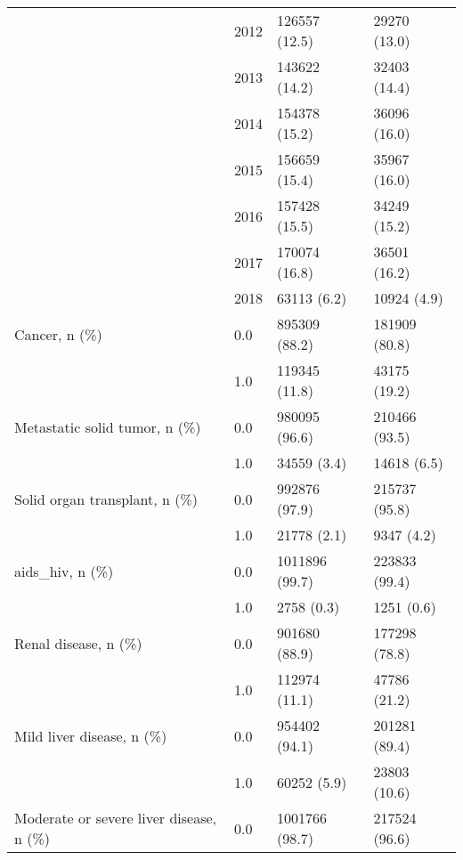 \begin{tabular}{llll}
                                       & 2012 &            126557 (12.5) &      29270 (13.0) \\
                                       & 2013 &            143622 (14.2) &      32403 (14.4) \\
                                       & 2014 &            154378 (15.2) &      36096 (16.0) \\
                                       & 2015 &            156659 (15.4) &      35967 (16.0) \\
                                       & 2016 &            157428 (15.5) &      34249 (15.2) \\
                                       & 2017 &            170074 (16.8) &      36501 (16.2) \\
                                       & 2018 &              63113 (6.2) &       10924 (4.9) \\
Cancer, n (\%) & 0.0 &            895309 (88.2) &     181909 (80.8) \\
                                       & 1.0 &            119345 (11.8) &      43175 (19.2) \\
Metastatic solid tumor, n (\%) & 0.0 &            980095 (96.6) &     210466 (93.5) \\
                                       & 1.0 &              34559 (3.4) &       14618 (6.5) \\
Solid organ transplant, n (\%) & 0.0 &            992876 (97.9) &     215737 (95.8) \\
                                       & 1.0 &              21778 (2.1) &        9347 (4.2) \\
aids\_hiv, n (\%) & 0.0 &           1011896 (99.7) &     223833 (99.4) \\
                                       & 1.0 &               2758 (0.3) &        1251 (0.6) \\
Renal disease, n (\%) & 0.0 &            901680 (88.9) &     177298 (78.8) \\
                                       & 1.0 &            112974 (11.1) &      47786 (21.2) \\
Mild liver disease, n (\%) & 0.0 &            954402 (94.1) &     201281 (89.4) \\
                                       & 1.0 &              60252 (5.9) &      23803 (10.6) \\
Moderate or severe liver disease, n (\%) & 0.0 &           1001766 (98.7) &     217524 (96.6) \\

\end{tabular}
